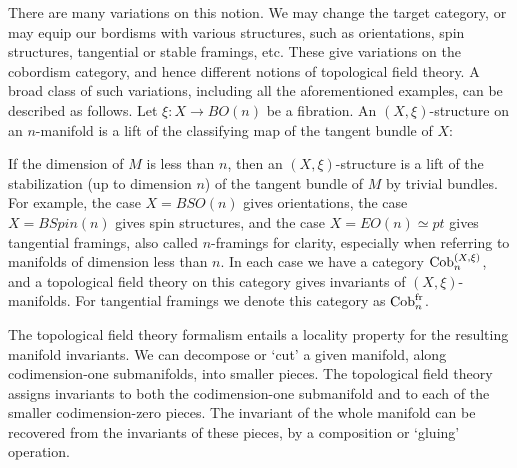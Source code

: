 \documentclass{amsart}
\begin{document}
There are many variations on this notion. We may change the target category, or may equip our bordisms with various structures, such as orientations, spin structures, tangential or stable framings, etc. These give variations on the cobordism category, and hence different notions of topological field theory. A broad class of such variations, including all the aforementioned examples, can be described as follows.  Let $\xi: X \to BO(n)$ be a fibration. An $(X, \xi)$-structure on an $n$-manifold is a lift of the classifying map of the tangent bundle of $X$:
\begin{center}
\end{center}
If the dimension of $M$ is less than $n$, then an $(X,\xi)$-structure is a lift of the stabilization (up to dimension $n$) of the tangent bundle of $M$ by trivial bundles.  For example, the case $X = BSO(n)$ gives orientations, the case $X = BSpin(n)$ gives spin structures, and the case $X = EO(n) \simeq pt$ gives tangential framings, also called $n$-framings for clarity, especially when referring to manifolds of dimension less than $n$.  
In each case we have a category $\mathrm{Cob}_n^{(X, \xi)}$, and a topological field theory on this category gives invariants of $(X,\xi)$-manifolds. For tangential framings we denote this category as $\mathrm{Cob}_n^{\mathrm{fr}}$.

The topological field theory formalism entails a locality property for the resulting manifold invariants. We can decompose or `cut' a given manifold, along codimension-one submanifolds, into smaller pieces. The topological field theory assigns invariants to both the codimension-one submanifold and to each of the smaller codimension-zero pieces.  The invariant of the whole manifold can be recovered from the invariants of these pieces, by a composition or `gluing' operation.
\end{document}
